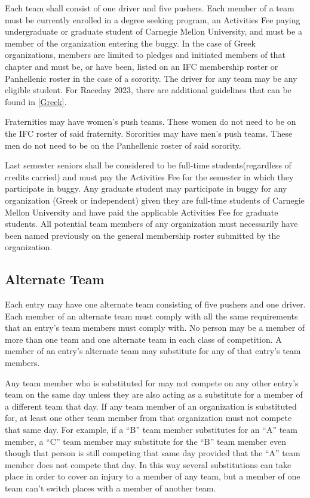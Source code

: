 	Each team shall consist of one driver and five pushers. Each member of a team must be currently enrolled in a degree seeking program, an Activities Fee paying undergraduate or graduate student of Carnegie Mellon University, and must be a member of the organization entering the buggy. In the case of Greek organizations, members are limited to pledges and initiated members of that chapter and must be, or have been, listed on an IFC membership roster or Panhellenic roster in the case of a sorority. The driver for any team may be any eligible student. For Raceday 2023, there are additional guidelines that can be found in \ref*{Greek}. 

	Fraternities may have women's push teams. These women do not need to be on the IFC roster of said fraternity. Sororities may have men's push teams. These men do not need to be on the Panhellenic roster of said sorority.

	Last semester seniors shall be considered to be full-time students(regardless of credits carried) and must pay the Activities Fee for the semester in which they participate in buggy. Any graduate student may participate in buggy for any organization (Greek or independent) given they are full-time students of Carnegie Mellon University and have paid the applicable Activities Fee for graduate students. All potential team members of any organization must necessarily have been named previously on the general membership roster submitted by the organization.

\subsection{Alternate Team}

	Each entry may have one alternate team consisting of five pushers and one driver. Each member of an alternate team must comply with all the same requirements that an entry's team members must comply with. No person may be a member of more than one team and one alternate team in each class of competition. A member of an entry's alternate team may substitute for any of that entry's team members.

	Any team member who is substituted for may not compete on any other entry's team on the same day unless they are also acting as a substitute for a member of a different team that day. If any team member of an organization is substituted for, at least one other team member from that organization must not compete that same day. For example, if a “B” team member substitutes for an “A” team member, a “C” team member may substitute for the “B” team member even though that person is still competing that same day provided that the “A” team member does not compete that day. In this way several substitutions can take place in order to cover an injury to a member of any team, but a member of one team can't switch places with a member of another team.	

